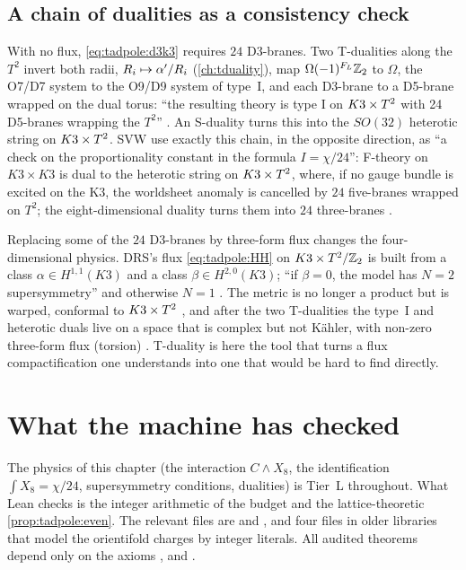 \subsection{A chain of dualities as a consistency check}
With no flux, \eqref{eq:tadpole:d3k3} requires $24$ D3-branes. Two T-dualities along the
$T^2$ invert both radii, $R_i\mapsto\alpha'/R_i$ (\cref{ch:tduality}), map
$\Omega(-1)^{F_L}\mathbb{Z}_2$ to $\Omega$, the O7/D7 system to the O9/D9 system of type~I, and each
D3-brane to a D5-brane wrapped on the dual torus: ``the resulting theory is type I on
$K3\times T^2$ with 24 D5-branes wrapping the $T^2$'' . An S-duality turns this into the $SO(32)$ heterotic string on $K3\times T^2$. SVW use exactly this chain, in the opposite direction, as ``a check on the proportionality
constant in the formula $I=\chi/24$'': F-theory on $K3\times K3$ is dual to the heterotic
string on $K3\times T^2$, where, if no gauge bundle is excited on the K3, the worldsheet anomaly is
cancelled by $24$ five-branes wrapped on $T^2$; the eight-dimensional duality turns them into
$24$ three-branes . \TL


\begin{physicsbox}
Replacing some of the $24$ D3-branes by three-form flux changes the four-dimensional physics.
DRS's flux \eqref{eq:tadpole:HH} on $K3\times T^2/\mathbb{Z}_2$ is built from a class $\alpha\in H^{1,1}(K3)$
and a class $\beta\in H^{2,0}(K3)$; ``if $\beta=0$, the model has $N=2$ supersymmetry'' and
otherwise $N=1$ . The metric is no longer a
product but is warped, conformal to $K3\times T^2$ , and after the two
T-dualities the type~I and heterotic duals live on a space that is complex but not K\"ahler,
with non-zero three-form flux (torsion) . T-duality is
here the tool that turns a flux compactification one understands into one that would be hard
to find directly.
\end{physicsbox}

\section{What the machine has checked}\label{sec:tadpole:lean}

The physics of this chapter (the interaction $C\wedge X_8$, the identification
$\int X_8=\chi/24$, supersymmetry conditions, dualities) is Tier~L throughout. What Lean
checks is the integer arithmetic of the budget and the lattice-theoretic
\cref{prop:tadpole:even}. The relevant files are  and
, and four files in older libraries that model
the orientifold charges by integer literals. All audited theorems depend only on the axioms
,  and .

